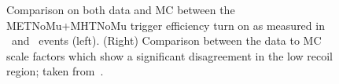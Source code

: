 \begin{figure}[hbtp]\begin{center}
    \caption{Comparison on both data and MC between the METNoMu+MHTNoMu trigger efficiency turn on as measured in \Wmn~and \Zmm~events (left). (Right) Comparison between the data to MC scale factors which show a significant disagreement in the low recoil region; taken from~\cite{CMS_AN_2016-473}.}
\label{fig:triggerComparison_wmn_zmm}\end{center}\end{figure}

